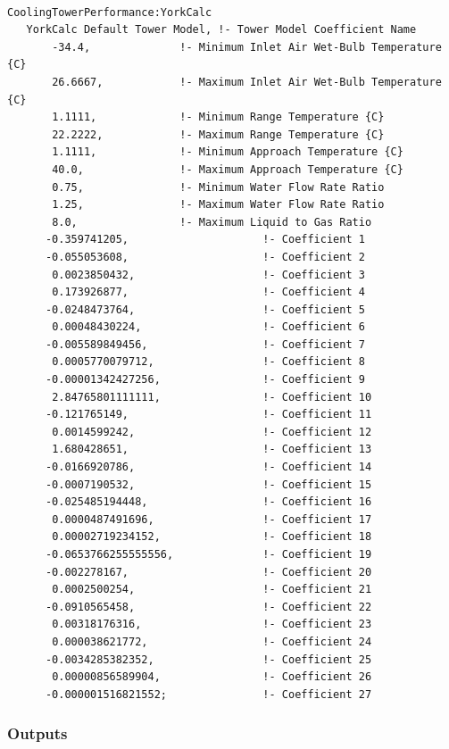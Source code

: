 \begin{lstlisting}

CoolingTowerPerformance:YorkCalc
   YorkCalc Default Tower Model, !- Tower Model Coefficient Name
       -34.4,              !- Minimum Inlet Air Wet-Bulb Temperature {C}
       26.6667,            !- Maximum Inlet Air Wet-Bulb Temperature {C}
       1.1111,             !- Minimum Range Temperature {C}
       22.2222,            !- Maximum Range Temperature {C}
       1.1111,             !- Minimum Approach Temperature {C}
       40.0,               !- Maximum Approach Temperature {C}
       0.75,               !- Minimum Water Flow Rate Ratio
       1.25,               !- Maximum Water Flow Rate Ratio
       8.0,                !- Maximum Liquid to Gas Ratio
      -0.359741205,                     !- Coefficient 1
      -0.055053608,                     !- Coefficient 2
       0.0023850432,                    !- Coefficient 3
       0.173926877,                     !- Coefficient 4
      -0.0248473764,                    !- Coefficient 5
       0.00048430224,                   !- Coefficient 6
      -0.005589849456,                  !- Coefficient 7
       0.0005770079712,                 !- Coefficient 8
      -0.00001342427256,                !- Coefficient 9
       2.84765801111111,                !- Coefficient 10
      -0.121765149,                     !- Coefficient 11
       0.0014599242,                    !- Coefficient 12
       1.680428651,                     !- Coefficient 13
      -0.0166920786,                    !- Coefficient 14
      -0.0007190532,                    !- Coefficient 15
      -0.025485194448,                  !- Coefficient 16
       0.0000487491696,                 !- Coefficient 17
       0.00002719234152,                !- Coefficient 18
      -0.0653766255555556,              !- Coefficient 19
      -0.002278167,                     !- Coefficient 20
       0.0002500254,                    !- Coefficient 21
      -0.0910565458,                    !- Coefficient 22
       0.00318176316,                   !- Coefficient 23
       0.000038621772,                  !- Coefficient 24
      -0.0034285382352,                 !- Coefficient 25
       0.00000856589904,                !- Coefficient 26
      -0.000001516821552;               !- Coefficient 27
\end{lstlisting}

\subsubsection{Outputs}\label{outputs-5-001}

